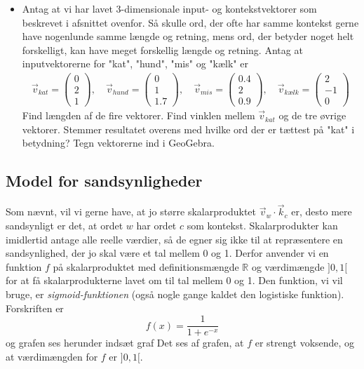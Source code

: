 \documentclass{article}
\newcommand{\am}[1]{{\color{red} #1}}
\begin{document}
\begin{itemize}
\item Antag at vi har lavet 3-dimensionale input- og kontekstvektorer som beskrevet i afsnittet ovenfor. Så skulle ord, der ofte har samme kontekst gerne have nogenlunde samme længde og retning, mens ord, der betyder noget helt forskelligt, kan have meget forskellig længde og retning. Antag at inputvektorerne for "kat", "hund", "mis" og "kælk" er
\begin{align*}
\overrightarrow{v}_{kat}=\begin{pmatrix}0\\2\\1 \end{pmatrix},\quad
\overrightarrow{v}_{hund}=\begin{pmatrix}0\\1\\1.7\end{pmatrix}, \quad
\overrightarrow{v}_{mis}=\begin{pmatrix}0.4\\2\\0.9\end{pmatrix},\quad
\overrightarrow{v}_{kælk}=\begin{pmatrix} 2\\-1\\0 \end{pmatrix}
\end{align*}
Find længden af de fire vektorer. Find vinklen mellem $\overrightarrow{v}_{kat}$ og de tre øvrige vektorer. Stemmer resultatet overens med hvilke ord der er tættest på "kat" i betydning? Tegn vektorerne ind i GeoGebra.

\end{itemize}

\subsection*{Model for sandsynligheder}
Som nævnt, vil vi gerne have, at jo større skalarproduktet $\overrightarrow{v}_{w}\cdot \overrightarrow{k}_{c}$ er, desto mere sandsynligt er det, at ordet $w$ har ordet $c$ som kontekst. 
Skalarprodukter kan imidlertid antage alle reelle værdier, så de egner sig ikke til at repræsentere en sandsynlighed, der jo skal være et tal mellem 0 og 1. Derfor anvender vi en funktion $f$ på skalarproduktet med definitionsmængde $\mathbb{R}$ og værdimængde $]0,1[$ for at få skalarprodukterne lavet om til tal mellem 0 og 1. Den funktion, vi vil bruge, er \emph{sigmoid-funktionen} (også nogle gange kaldet den logistiske funktion). Forskriften er 
\begin{equation}\label{eq:sigmoid}
f(x)=\frac{1}{1+e^{-x}}
\end{equation}
og grafen ses herunder
\am{indsæt graf}
Det ses af grafen, at $f$ er strengt voksende, og at værdimængden for $f$ er $]0,1[$.
\end{document}
